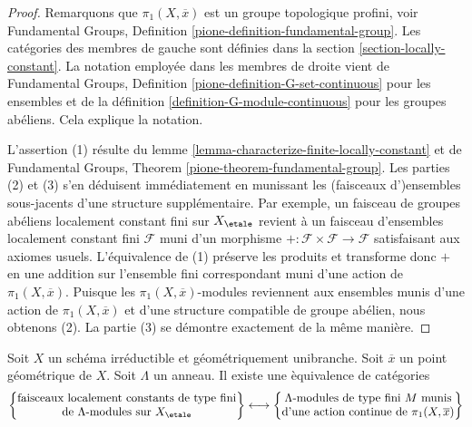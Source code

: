 \begin{proof}
Remarquons que $\pi_1(X, \overline{x})$ est un groupe topologique
profini, voir Fundamental Groups, Definition
\ref{pione-definition-fundamental-group}.
Les cat\'egories des membres de gauche sont d\'efinies dans la
section \ref{section-locally-constant}.
La notation employ\'ee dans les membres de droite vient de
Fundamental Groups, Definition \ref{pione-definition-G-set-continuous}
pour les ensembles et de la
d\'efinition \ref{definition-G-module-continuous} pour les groupes ab\'eliens.
Cela explique la notation.

\medskip\noindent
L'assertion (1) r\'esulte du
lemme \ref{lemma-characterize-finite-locally-constant}
et de Fundamental Groups, Theorem \ref{pione-theorem-fundamental-group}.
Les parties (2) et (3) s'en d\'eduisent imm\'ediatement en munissant les
(faisceaux d')ensembles sous-jacents d'une structure suppl\'ementaire. Par exemple, un
faisceau de groupes ab\'eliens localement constant fini sur $X_\etale$ revient
\`a un faisceau d'ensembles localement constant fini $\mathcal{F}$
muni d'un morphisme $+ : \mathcal{F} \times \mathcal{F} \to \mathcal{F}$
satisfaisant aux axiomes usuels. L'\'equivalence de (1) pr\'eserve les produits
et transforme donc $+$ en une addition sur l'ensemble fini correspondant
muni d'une action de $\pi_1(X, \overline{x})$. Puisque les $\pi_1(X, \overline{x})$-modules
reviennent aux ensembles munis d'une action de $\pi_1(X, \overline{x})$ et d'une
structure compatible de groupe ab\'elien, nous obtenons (2). La partie (3) se d\'emontre
exactement de la m\^eme mani\`ere.
\end{proof}

\begin{lemma}
\label{lemma-locally-constant-on-connected-geom-unibranch}
Soit $X$ un sch\'ema irr\'eductible et g\'eom\'etriquement unibranche.
Soit $\overline{x}$ un point g\'eom\'etrique de $X$.
Soit $\Lambda$ un anneau. Il existe une \`equivalence de cat\'egories
$$
\left\{
\begin{matrix}
\text{faisceaux localement constants de type fini}\\
\text{de }\Lambda\text{-modules sur }X_\etale
\end{matrix}
\right\}
\longleftrightarrow
\left\{
\begin{matrix}
\Lambda\text{-modules de type fini }M\text{ munis}\\
\text{d'une action continue de }\pi_1(X, \overline{x})
\end{matrix}
\right\}
$$
\end{lemma}

